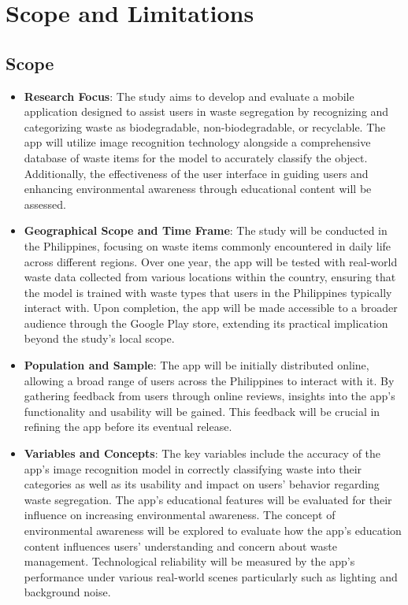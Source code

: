 \section{Scope and Limitations}

\subsection{Scope}
\begin{itemize}
	\item \textbf{Research Focus}: The study aims to develop and evaluate a mobile application designed to assist users in waste segregation by recognizing and categorizing waste as biodegradable, non-biodegradable, or recyclable. The app will utilize image recognition technology alongside a comprehensive database of waste items for the model to accurately classify the object. Additionally, the effectiveness of the user interface in guiding users and enhancing environmental awareness through educational content will be assessed.
	
	\item \textbf{Geographical Scope and Time Frame}: The study will be conducted in the Philippines, focusing on waste items commonly encountered in daily life across different regions. Over one year, the app will be tested with real-world waste data collected from various locations within the country, ensuring that the model is trained with waste types that users in the Philippines typically interact with. Upon completion, the app will be made accessible to a broader audience through the Google Play store, extending its practical implication beyond the study's local scope.
	
	\item \textbf{Population and Sample}: The app will be initially distributed online, allowing a broad range of users across the Philippines to interact with it. By gathering feedback from users through online reviews, insights into the app's functionality and usability will be gained. This feedback will be crucial in refining the app before its eventual release.
	
	\item \textbf{Variables and Concepts}: The key variables include the accuracy of the app's image recognition model in correctly classifying waste into their categories as well as its usability and impact on users'  behavior regarding waste segregation. The app's educational features will be evaluated for their influence on increasing environmental awareness. The concept of environmental awareness will be explored to evaluate how the app's education content influences users' understanding and concern about waste management. Technological reliability will be measured by the app's performance under various real-world scenes particularly such as lighting and background noise.
	

\end{itemize}
